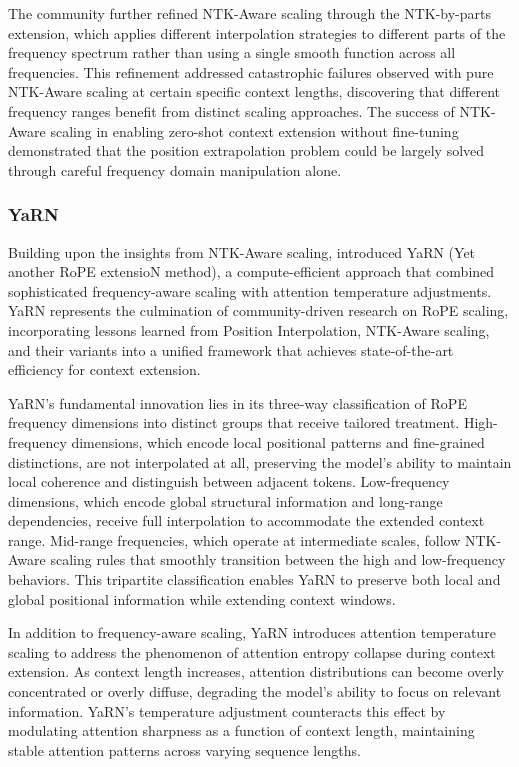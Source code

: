 \documentclass[11pt,letterpaper]{article}
\begin{document}
The community further refined NTK-Aware scaling through the NTK-by-parts extension, which applies different interpolation strategies to different parts of the frequency spectrum rather than using a single smooth function across all frequencies. This refinement addressed catastrophic failures observed with pure NTK-Aware scaling at certain specific context lengths, discovering that different frequency ranges benefit from distinct scaling approaches. The success of NTK-Aware scaling in enabling zero-shot context extension without fine-tuning demonstrated that the position extrapolation problem could be largely solved through careful frequency domain manipulation alone.

\subsubsection{YaRN}

Building upon the insights from NTK-Aware scaling, \cite{peng2024yarn} introduced YaRN (Yet another RoPE extensioN method), a compute-efficient approach that combined sophisticated frequency-aware scaling with attention temperature adjustments. YaRN represents the culmination of community-driven research on RoPE scaling, incorporating lessons learned from Position Interpolation, NTK-Aware scaling, and their variants into a unified framework that achieves state-of-the-art efficiency for context extension.

YaRN's fundamental innovation lies in its three-way classification of RoPE frequency dimensions into distinct groups that receive tailored treatment. High-frequency dimensions, which encode local positional patterns and fine-grained distinctions, are not interpolated at all, preserving the model's ability to maintain local coherence and distinguish between adjacent tokens. Low-frequency dimensions, which encode global structural information and long-range dependencies, receive full interpolation to accommodate the extended context range. Mid-range frequencies, which operate at intermediate scales, follow NTK-Aware scaling rules that smoothly transition between the high and low-frequency behaviors. This tripartite classification enables YaRN to preserve both local and global positional information while extending context windows.

In addition to frequency-aware scaling, YaRN introduces attention temperature scaling to address the phenomenon of attention entropy collapse during context extension. As context length increases, attention distributions can become overly concentrated or overly diffuse, degrading the model's ability to focus on relevant information. YaRN's temperature adjustment counteracts this effect by modulating attention sharpness as a function of context length, maintaining stable attention patterns across varying sequence lengths.
\end{document}
